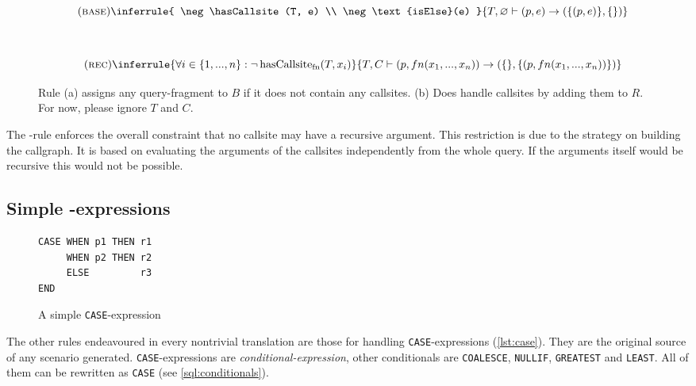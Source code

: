\begin{figure}[h]\small
    \begin{minipage}[b]{\linewidth}
    \centering %
    
  $$
\quad(\textsc{base})\inferrule{
   \neg \hasCallsite(T, e) \\
   \neg \text{isElse}(e)
}{
    T, \varnothing \vdash (p, e) \rightarrow (\{(p, e)\},\{\})
}$$
    \subcaption{}\label{rule:base}
    \end{minipage}\\
    \begin{minipage}[b]{\linewidth}
    \centering %
$$\quad(\textsc{rec})\inferrule{
   \forall i \in \{1, ..., n\} : \neg \hasCallsite(T, x_i)
}{
    T, C \vdash (p, fn(x_1, ..., x_n)) \rightarrow (\{\}, \{(p, fn(x_1, ..., x_n))\})
}
$$
    \subcaption{}\label{rule:rec}
    \end{minipage}
    \caption{Rule (a) assigns any query-fragment to $B$ if it does not contain any callsites. (b) Does handle callsites by adding them to $R$. For now, please ignore $T$ and $C$.}\label{rule:base_and_rec}
\end{figure}

The \RREC-rule enforces the overall constraint that no callsite may have a recursive argument. This restriction is due to the strategy on building the callgraph. It is based on evaluating the arguments of the callsites independently from the whole query. If the arguments itself would be recursive this would not be possible.

\subsection{Simple \CASE-expressions}
\begin{wrapfigure}{r}{.3\textwidth}\centering
\begin{verbatim}
CASE WHEN p1 THEN r1
     WHEN p2 THEN r2
     ELSE         r3
END
\end{verbatim}
\caption{A simple \texttt{CASE}-expression}\vspace{-5mm} 
\label{lst:case}
\end{wrapfigure}

The other rules endeavoured in every nontrivial translation are those for handling \texttt{CASE}-expressions (\autoref{lst:case}). They are the original source of any scenario generated. \texttt{CASE}-expressions are \textit{conditional-expression}, other conditionals are \texttt{COALESCE}, \texttt{NULLIF}, \texttt{GREATEST} and \texttt{LEAST}. All of them can be rewritten as \texttt{CASE} (see \autoref{sql:conditionals}).

